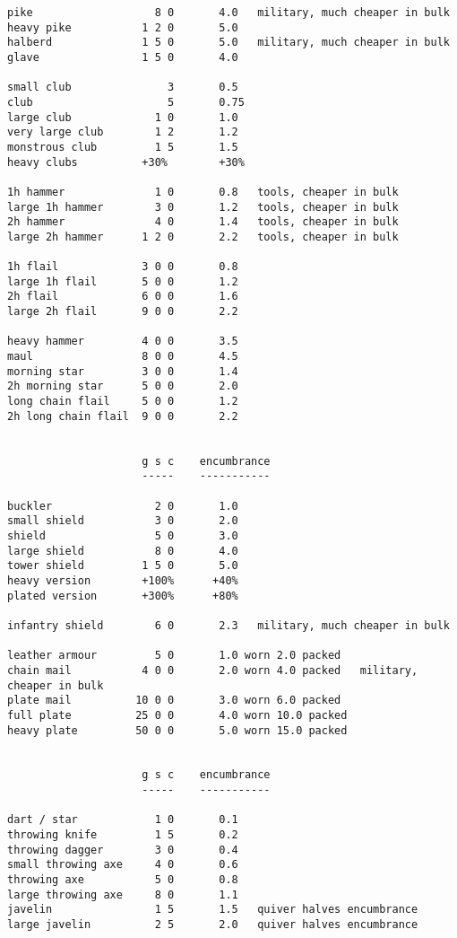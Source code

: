 \begin{verbatim}
pike                   8 0       4.0   military, much cheaper in bulk
heavy pike           1 2 0       5.0
halberd              1 5 0       5.0   military, much cheaper in bulk
glave                1 5 0       4.0

small club               3       0.5
club                     5       0.75
large club             1 0       1.0
very large club        1 2       1.2
monstrous club         1 5       1.5
heavy clubs          +30%        +30%

1h hammer              1 0       0.8   tools, cheaper in bulk
large 1h hammer        3 0       1.2   tools, cheaper in bulk
2h hammer              4 0       1.4   tools, cheaper in bulk
large 2h hammer      1 2 0       2.2   tools, cheaper in bulk

1h flail             3 0 0       0.8
large 1h flail       5 0 0       1.2
2h flail             6 0 0       1.6
large 2h flail       9 0 0       2.2

heavy hammer         4 0 0       3.5
maul                 8 0 0       4.5
morning star         3 0 0       1.4
2h morning star      5 0 0       2.0
long chain flail     5 0 0       1.2
2h long chain flail  9 0 0       2.2


                     g s c    encumbrance
                     -----    -----------

buckler                2 0       1.0
small shield           3 0       2.0
shield                 5 0       3.0
large shield           8 0       4.0
tower shield         1 5 0       5.0
heavy version        +100%      +40%
plated version       +300%      +80%

infantry shield        6 0       2.3   military, much cheaper in bulk

leather armour         5 0       1.0 worn 2.0 packed
chain mail           4 0 0       2.0 worn 4.0 packed   military, cheaper in bulk
plate mail          10 0 0       3.0 worn 6.0 packed
full plate          25 0 0       4.0 worn 10.0 packed
heavy plate         50 0 0       5.0 worn 15.0 packed


                     g s c    encumbrance
                     -----    -----------

dart / star            1 0       0.1
throwing knife         1 5       0.2
throwing dagger        3 0       0.4
small throwing axe     4 0       0.6
throwing axe           5 0       0.8
large throwing axe     8 0       1.1
javelin                1 5       1.5   quiver halves encumbrance
large javelin          2 5       2.0   quiver halves encumbrance



\end{verbatim}
